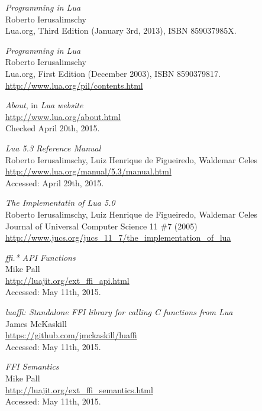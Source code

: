 \begin{thebibliography}{99}
		\emph{Programming in Lua} \\
		Roberto Ierusalimschy \\
		Lua.org, Third Edition (January 3rd, 2013), ISBN 859037985X.

		\emph{Programming in Lua} \\
		Roberto Ierusalimschy \\
		Lua.org, First Edition (December 2003), ISBN 8590379817. \\
		\url{http://www.lua.org/pil/contents.html}

		\emph{About}, in \emph{Lua website} \\
		\url{http://www.lua.org/about.html} \\
		Checked April 20th, 2015.

		\emph{Lua 5.3 Reference Manual} \\
		Roberto Ierusalimschy, Luiz Henrique de Figueiredo,
		Waldemar Celes \\
		\url{http://www.lua.org/manual/5.3/manual.html} \\
		Accessed: April 29th, 2015.

		\emph{The Implementatin of Lua 5.0} \\
		Roberto Ierusalimschy, Luiz Henrique de Figueiredo,
		Waldemar Celes \\
		Journal of Universal Computer Science 11 \#7 (2005) \\
		\url{http://www.jucs.org/jucs_11_7/the_implementation_of_lua}

		\emph{ffi.* API Functions} \\
		Mike Pall \\
		\url{http://luajit.org/ext_ffi_api.html} \\
		Accessed: May 11th, 2015.

		\emph{luaffi: Standalone FFI library for calling C functions from Lua}  \\
		James McKaskill \\
		\url{https://github.com/jmckaskill/luaffi} \\
		Accessed: May 11th, 2015.

		\emph{FFI Semantics} \\
		Mike Pall \\
		\url{http://luajit.org/ext_ffi_semantics.html} \\
		Accessed: May 11th, 2015.


\end{thebibliography}
